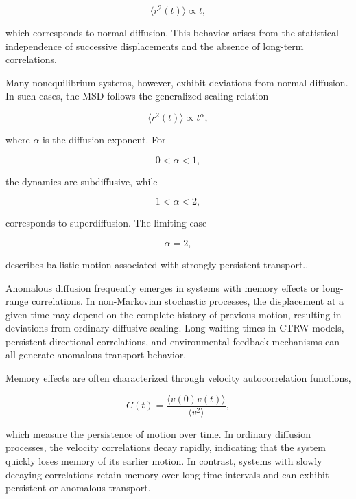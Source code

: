 \begin{equation}
\langle r^2(t)\rangle
\propto
t,
\end{equation}

which corresponds to normal diffusion. This behavior arises from the statistical independence of successive displacements and the absence of long-term correlations.

Many nonequilibrium systems, however, exhibit deviations from normal diffusion. In such cases, the MSD follows the generalized scaling relation

\begin{equation}
\langle r^2(t)\rangle
\propto
t^\alpha,
\end{equation}

where $\alpha$ is the diffusion exponent. For

\begin{equation}
0<\alpha<1,
\end{equation}

the dynamics are subdiffusive, while

\begin{equation}
1<\alpha<2,
\end{equation}

corresponds to superdiffusion. The limiting case

\begin{equation}
\alpha=2,
\end{equation}

describes ballistic motion associated with strongly persistent transport\cite{balakrishnan2021}..

Anomalous diffusion frequently emerges in systems with memory effects or long-range correlations. In non-Markovian stochastic processes, the displacement at a given time may depend on the complete history of previous motion, resulting in deviations from ordinary diffusive scaling. Long waiting times in CTRW models, persistent directional correlations, and environmental feedback mechanisms can all generate anomalous transport behavior\cite{balakrishnan2021,schutz2004}.

Memory effects are often characterized through velocity autocorrelation functions,

\begin{equation}
C(t)
=
\frac{
\langle v(0)v(t)\rangle
}{
\langle v^2\rangle
},
\end{equation}

which measure the persistence of motion over time. In ordinary diffusion processes, the velocity correlations decay rapidly, indicating that the system quickly loses memory of its earlier motion. In contrast, systems with slowly decaying correlations retain memory over long time intervals and can exhibit persistent or anomalous transport.

